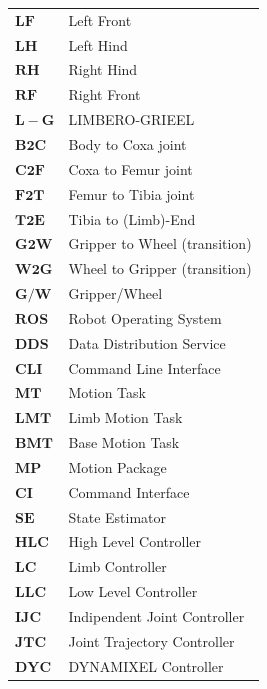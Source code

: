 \begin{table}[H]
    \begin{tabular}{ll}
        $\bm{LF}$ & Left Front \\[2pt]
        $\bm{LH}$ & Left Hind \\[2pt]
        $\bm{RH}$ & Right Hind\\[2pt]
        $\bm{RF}$ & Right Front\\[2pt]
        $\bm{L-G}$ & LIMBERO-GRIEEL \\[2pt]
        $\bm{B2C}$ & Body to Coxa joint\\[2pt]
        $\bm{C2F}$ & Coxa to Femur joint\\[2pt]
        $\bm{F2T}$ & Femur to Tibia joint\\[2pt]
        $\bm{T2E}$ & Tibia to (Limb)-End\\[2pt]
        $\bm{G2W}$ & Gripper to Wheel (transition)\\[2pt]
        $\bm{W2G}$ & Wheel to Gripper (transition)\\[2pt]
        $\bm{G/W}$ & Gripper/Wheel \\[2pt]
        $\bm{ROS}$ & Robot Operating System \\[2pt]
        $\bm{DDS}$ & Data Distribution Service \\[2pt]
        $\bm{CLI}$ & Command Line Interface \\[2pt]
        $\bm{MT}$ & Motion Task \\[2pt]
        $\bm{LMT}$ & Limb Motion Task \\[2pt]
        $\bm{BMT}$ & Base Motion Task \\[2pt]
        $\bm{MP}$ & Motion Package \\[2pt]
        $\bm{CI}$ & Command Interface \\[2pt]
        $\bm{SE}$ & State Estimator \\[2pt]
        $\bm{HLC}$ & High Level Controller \\[2pt]
        $\bm{LC}$ & Limb Controller \\[2pt]
        $\bm{LLC}$ & Low Level Controller \\[2pt]
        $\bm{IJC}$ & Indipendent Joint Controller \\[2pt]
        $\bm{JTC}$ & Joint Trajectory Controller \\[2pt]
        $\bm{DYC}$ & DYNAMIXEL Controller\\[2pt]
        
    \end{tabular}
\end{table}



